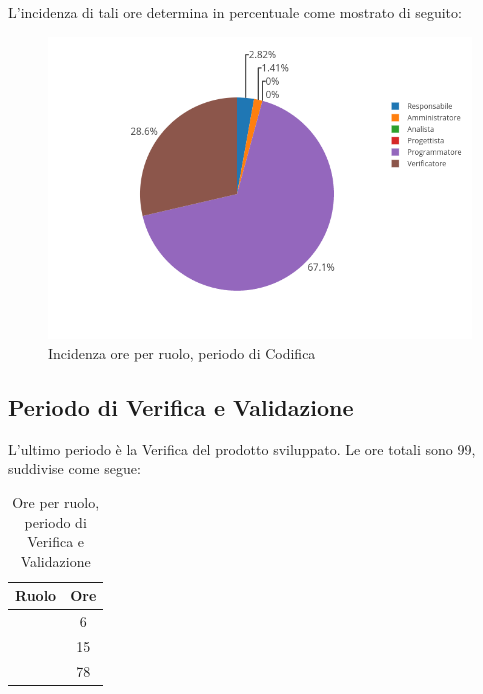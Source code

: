 L'incidenza di tali ore determina in percentuale come mostrato di seguito:
\begin{figure}[H]
	\centering
	\includegraphics[scale=0.6]{img/Codifica.png}
	\caption{Incidenza ore per ruolo, periodo di Codifica}
\end{figure}

\subsection{Periodo di Verifica e Validazione}
L'ultimo periodo è la Verifica del prodotto sviluppato. Le ore totali sono 99, suddivise come segue:

\begin{table}[H]
	\begin{center}
		\begin{tabular}{|c|c|}
			\hline
			\textbf{Ruolo}	& \textbf{Ore} \\
			\hline
			\Res	&	6	\\
			\hline
			\Prog   &	15	\\
			\hline
			\Ver	&	78	\\
			\hline
		\end{tabular}
	\end{center}
	\caption{Ore per ruolo, periodo di Verifica e Validazione}
\end{table}

